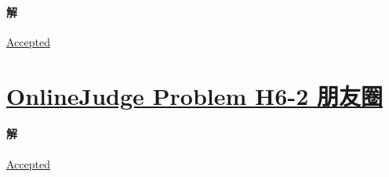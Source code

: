 \documentclass{article}
\newcommand{\SetHrefColor}[1]{
	\hypersetup{urlcolor=#1}
}
\begin{document}
\SetHrefColor{blue!30!green}

\paragraph{解}
\href{https://202.38.86.171/status/829aee86f921ebd694c0d52303582a55}{\underline{Accepted}}

\SetHrefColor{black}
\section{\href{https://202.38.86.171/problem/H6-1}{OnlineJudge Problem H6-2 朋友圈}}
\SetHrefColor{blue!30!green}
\paragraph{解}
\href{https://202.38.86.171/status/7ea7548feef36a762b4a53e940d47aba}{\underline{Accepted}}
\end{document}
